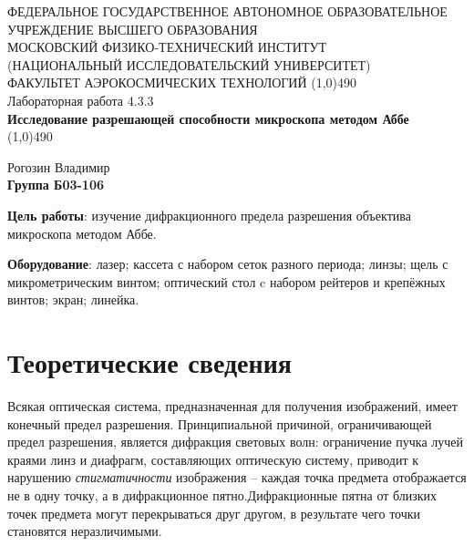 \documentclass[a4paper,12pt]{article}
\begin{document}
\begin{titlepage}
\begin{center}
\large{\small ФЕДЕРАЛЬНОЕ ГОСУДАРСТВЕННОЕ АВТОНОМНОЕ ОБРАЗОВАТЕЛЬНОЕ\\ УЧРЕЖДЕНИЕ ВЫСШЕГО ОБРАЗОВАНИЯ \\ МОСКОВСКИЙ ФИЗИКО-ТЕХНИЧЕСКИЙ ИНСТИТУТ\\ (НАЦИОНАЛЬНЫЙ ИССЛЕДОВАТЕЛЬСКИЙ УНИВЕРСИТЕТ)\\ ФАКУЛЬТЕТ АЭРОКОСМИЧЕСКИХ ТЕХНОЛОГИЙ}
\vfill
\line(1,0){490}\\[1mm]
\huge{Лабораторная работа 4.3.3}\\
\huge\textbf{Исследование разрешающей способности микроскопа методом Аббе}\\
\line(1,0){490}\\[1mm]
\vfill
\begin{flushright}
\normalsize{Рогозин Владимир}\\
\normalsize{\textbf{Группа Б03-106}}\\
\end{flushright}
\end{center}
\end{titlepage}

\textbf{Цель работы}:
изучение дифракционного предела разрешения объектива микроскопа методом Аббе.


\textbf{Оборудование}:
лазер; кассета с набором сеток разного
периода; линзы; щель с микрометрическим винтом; оптический стол
c набором рейтеров и крепёжных винтов; экран; линейка.


\section{Теоретические сведения}
Всякая оптическая система, предназначенная для получения изображений, имеет конечный предел разрешения. Принципиальной причиной, ограничивающей предел разрешения, является дифракция световых волн: ограничение пучка лучей краями линз и диафрагм, составляющих оптическую систему, приводит к нарушению \textit{стигматичности} изображения -- каждая точка предмета отображается не в одну точку, а в дифракционное пятно.Дифракционные пятна от близких точек предмета могут перекрываться друг другом, в результате чего точки становятся неразличимыми.
\end{document}
